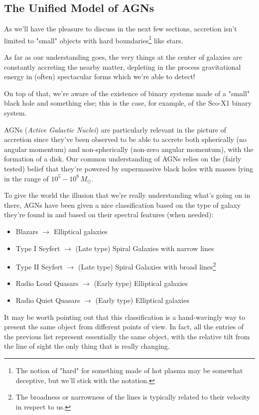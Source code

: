\subsection{The Unified Model of AGNs}
As we'll have the pleasure to discuss in the next few sections, accretion isn't limited to "small" objects with hard boundaries\footnote{The notion of "hard" for something made of hot plasma may be somewhat deceptive, but we'll stick with the notation.} like stars.
\par As far as our understanding goes, the very things at the center of galaxies are constantly accreting the nearby matter, depleting in the process gravitational energy in (often) spectacular forms which we're able to detect!
\par On top of that, we're aware of the existence of binary systems made of a "small" black hole and something else; this is the case, for example, of the Sco-X1 binary system.
\par AGNs (\emph{Active Galactic Nuclei}) are particularly relevant in the picture of accretion since they've been observed to be able to accrete both spherically (no angular momentum) and non-spherically (non-zero angular momentum), with the formation of a disk. Our common understanding of AGNs relies on the (fairly tested) belief that they're powered by supermassive black holes with masses lying in the range of $10^{5}-10^{8}\,M_{\odot}$.
\par To give the world the illusion that we're really understanding what's going on in there, AGNs have been given a nice classification based on the type of galaxy they're found in and based on their spectral features (when needed):
\begin{itemize}
    \item Blazars $\to$ Elliptical galaxies
    \item Type I Seyfert $\to$ (Late type) Spiral Galaxies with narrow lines
    \item Type II Seyfert $\to$ (Late type) Spiral Galaxies with broad lines\footnote{The broadness or narrowness of the lines is typically related to their velocity in respect to us.}
    \item Radio Loud Quasars $\to$ (Early type) Elliptical galaxies
    \item Radio Quiet Quasars $\to$ (Early type) Elliptical galaxies
\end{itemize}
\par It may be worth pointing out that this classification is a hand-wavingly way to present the same object from different points of view. In fact, all the entries of the previous list represent essentially the same object, with the relative tilt from the line of sight the only thing that is really changing.

